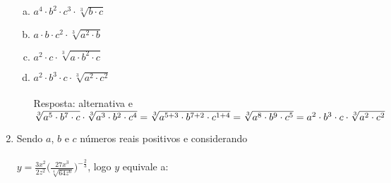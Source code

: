 \documentclass[a4paper,14pt]{article}
\begin{document}
\begin{multicols}{2}
\begin{enumerate}
\begin{enumerate}[a)]
            \item $a^4 \cdot b^2 \cdot c^3 \cdot \sqrt[3]{b \cdot c}$
            \item $a \cdot b \cdot c^2 \cdot \sqrt[3]{a^2 \cdot b}$
            \item $a^2 \cdot c \cdot \sqrt[3]{a \cdot b^2 \cdot c}$
            \item $a^2 \cdot b^3 \cdot c \cdot \sqrt[3]{a^2 \cdot c^2}$\\\\
            Resposta: alternativa e\\
            $\sqrt[3]{a^5 \cdot b^7 \cdot c} \cdot \sqrt[3]{a^3 \cdot b^2 \cdot c^4} \\
            = \sqrt[3]{a^{5 + 3} \cdot b^{7 + 2} \cdot c^{1 + 4}} \\
            = \sqrt[3]{a^8 \cdot b^9 \cdot c^5}\\
            = a^2 \cdot b^3 \cdot c \cdot \sqrt[3]{a^2 \cdot c^2}$\\
        \end{enumerate}
        \item Sendo $a$, $b$ e $c$ números reais positivos e considerando \\\\$y = \frac{3x^2}{2z^2} \bigg(\frac{27x^3}{\sqrt[4]{64z^6}}\bigg)^{-\frac{2}{3}}$, logo $y$ equivale a:
\end{enumerate}
\end{multicols}
\end{document}
